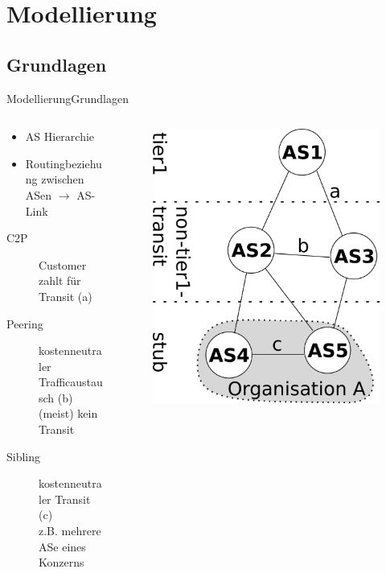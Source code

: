 \documentclass[ngerman,compress,hyperref={bookmarks}]{beamer}
\begin{document}

\section{Modellierung}

\subsection{Grundlagen}
\begin{frame}{Modellierung}{Grundlagen}
  \begin{columns}[c]
    \begin{column}{0.7\textwidth}
      \begin{itemize}
        \item AS Hierarchie
        \item Routingbeziehung zwischen ASen $\rightarrow$ AS-Link
      \end{itemize}
      \begin{description}
        \item[C2P] Customer zahlt für Transit (a)
        \item[Peering] kostenneutraler Trafficaustausch (b)\\{\scriptsize(meist) kein Transit}
        \item[Sibling] kostenneutraler Transit (c)\\{\scriptsize z.B. mehrere ASe eines Konzerns}
      \end{description}
    \end{column}
    \begin{column}{0.3\textwidth}
      \begin{figure}
        \includegraphics[width=1\textwidth]{images/Routingbeziehungen}

\end{figure}
\end{column}
\end{columns}
\end{frame}
\end{document}
